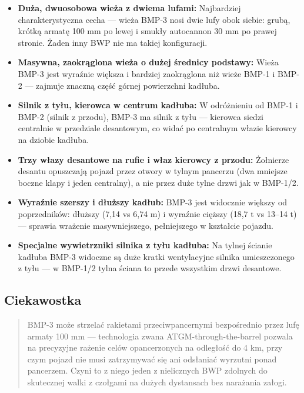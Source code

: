 \documentclass[12pt,oneside]{book}
\providecommand{\tightlist}{%
  \setlength{\itemsep}{0pt}\setlength{\parskip}{0pt}}
\begin{document}
\begin{itemize}
\tightlist
\item
  \textbf{Duża, dwuosobowa wieża z dwiema lufami:} Najbardziej
  charakterystyczna cecha --- wieża BMP-3 nosi dwie lufy obok siebie:
  grubą, krótką armatę 100 mm po lewej i smukły autocannon 30 mm po
  prawej stronie. Żaden inny BWP nie ma takiej konfiguracji.
\item
  \textbf{Masywna, zaokrąglona wieża o dużej średnicy podstawy:} Wieża
  BMP-3 jest wyraźnie większa i bardziej zaokrąglona niż wieże BMP-1 i
  BMP-2 --- zajmuje znaczną część górnej powierzchni kadłuba.
\item
  \textbf{Silnik z tyłu, kierowca w centrum kadłuba:} W odróżnieniu od
  BMP-1 i BMP-2 (silnik z przodu), BMP-3 ma silnik z tyłu --- kierowca
  siedzi centralnie w przedziale desantowym, co widać po centralnym
  włazie kierowcy na dziobie kadłuba.
\item
  \textbf{Trzy włazy desantowe na rufie i właz kierowcy z przodu:}
  Żołnierze desantu opuszczają pojazd przez otwory w tylnym pancerzu
  (dwa mniejsze boczne klapy i jeden centralny), a nie przez duże tylne
  drzwi jak w BMP-1/2.
\item
  \textbf{Wyraźnie szerszy i dłuższy kadłub:} BMP-3 jest widocznie
  większy od poprzedników: dłuższy (7,14 vs 6,74 m) i wyraźnie cięższy
  (18,7 t vs 13--14 t) --- sprawia wrażenie masywniejszego, pełniejszego
  w kształcie pojazdu.
\item
  \textbf{Specjalne wywietrzniki silnika z tyłu kadłuba:} Na tylnej
  ścianie kadłuba BMP-3 widoczne są duże kratki wentylacyjne silnika
  umieszczonego z tyłu --- w BMP-1/2 tylna ściana to przede wszystkim
  drzwi desantowe.
\end{itemize}

\subsection{Ciekawostka}\label{ciekawostka-13}

\begin{quote}
BMP-3 może strzelać rakietami przeciwpancernymi bezpośrednio przez lufę
armaty 100 mm --- technologia zwana ATGM-through-the-barrel pozwala na
precyzyjne rażenie celów opancerzonych na odległość do 4 km, przy czym
pojazd nie musi zatrzymywać się ani odsłaniać wyrzutni ponad pancerzem.
Czyni to z niego jeden z nielicznych BWP zdolnych do skutecznej walki z
czołgami na dużych dystansach bez narażania załogi.
\end{quote}
\end{document}
